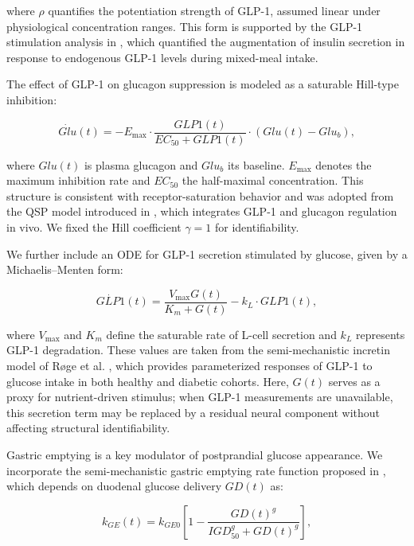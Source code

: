\documentclass[9pt,shortpaper,twoside,web]{ieeecolor}
\begin{document}
where \( \rho \) quantifies the potentiation strength of GLP-1, assumed linear under physiological concentration ranges. This form is supported by the GLP-1 stimulation analysis in \cite{DallaMan2016}, which quantified the augmentation of insulin secretion in response to endogenous GLP-1 levels during mixed-meal intake.

The effect of GLP-1 on glucagon suppression is modeled as a saturable Hill-type inhibition:

\begin{equation}
\dot{Glu}(t) = -E_{\max} \cdot \frac{GLP1(t)}{EC_{50} + GLP1(t)} \cdot (Glu(t) - Glu_b),
\label{eq:GLP2Glu}
\end{equation}

where \( Glu(t) \) is plasma glucagon and \( Glu_b \) its baseline. \( E_{\max} \) denotes the maximum inhibition rate and \( EC_{50} \) the half-maximal concentration. This structure is consistent with receptor-saturation behavior and was adopted from the QSP model introduced in \cite{Bosch2022}, which integrates GLP-1 and glucagon regulation in vivo. We fixed the Hill coefficient \( \gamma = 1 \) for identifiability.

We further include an ODE for GLP-1 secretion stimulated by glucose, given by a Michaelis–Menten form:

\begin{equation}
\dot{GLP1}(t) = \frac{V_{\max} G(t)}{K_m + G(t)} - k_L \cdot GLP1(t),
\label{eq:G2GLP}
\end{equation}

where \( V_{\max} \) and \( K_m \) define the saturable rate of L-cell secretion and \( k_L \) represents GLP-1 degradation. These values are taken from the semi-mechanistic incretin model of Røge et al. \cite{Roge2017}, which provides parameterized responses of GLP-1 to glucose intake in both healthy and diabetic cohorts. Here, \(G(t)\) serves as a proxy for nutrient-driven stimulus; when GLP-1 measurements are unavailable, this secretion term may be replaced by a residual neural component without affecting structural identifiability.

Gastric emptying is a key modulator of postprandial glucose appearance. We incorporate the semi-mechanistic gastric emptying rate function proposed in \cite{Alskar2016}, which depends on duodenal glucose delivery \( GD(t) \) as:

\begin{equation}
k_{GE}(t) = k_{GE0} \left[ 1 - \frac{GD(t)^g}{IGD_{50}^g + GD(t)^g} \right],
\label{eq:GE}
\end{equation}
\end{document}
